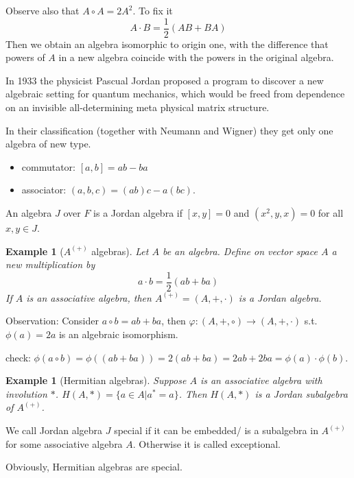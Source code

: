 \documentclass{article}
\newtheorem{example}[theorem]{Example}
\begin{document}
Observe also that $A \circ A = 2A^2$. To fix it
\[
A \cdot B = \frac{1}{2}(AB+BA)
\]
Then we obtain an algebra isomorphic to origin one, with the difference that powers of $A$ in a new algebra coincide with the powers in the original algebra.

In 1933 the physicist Pascual Jordan proposed a program to discover a new algebraic setting for quantum mechanics, which would be freed from dependence on an invisible all-determining meta physical matrix structure.

In their classification (together with Neumann and Wigner) they get only one algebra of new type.

\begin{itemize}
\item commutator: $ [a,b] =a b-b a$
\item associator: $ (a,b,c)=(ab) c-a (b c) $.  
\end{itemize}   

\begin{definition}
An algebra $J$ over $F$ is a Jordan algebra if $[x,y]=0$ and $(x^2,y,x)=0$ for all $x,y \in J$.
\end{definition}

\begin{example}[$ A^{(+)} $ algebras] 
Let $A$ be an algebra. Define on vector space $ A $ a new multiplication by
\[
a \cdot b = \frac{1}{2}(ab+ba)
\]
If $A$ is an associative algebra, then $A^{(+)} = (A, +, \cdot)$ is a Jordan algebra.
\end{example}

Observation: Consider $ a \circ b=ab+ba $, then $ \varphi:  (A, +, \circ) \to (A, +, \cdot) $ s.t. $ \phi(a)=2a $ is an algebraic isomorphism.

check: $ \phi(a \circ b) = \phi((ab+ba)) = 2(ab+ba) = 2ab+2ba = \phi(a) \cdot \phi(b) $.

\begin{example}[Hermitian algebras] 
Suppose $ A $ is an associative algebra with involution $ *$. $ H(A,*) =\{a \in A | a^*=a\}$. Then $ H(A,*) $ is a Jordan subalgebra of $ A^{(+)} $. 
\end{example}

\begin{definition} 
We call Jordan algebra $ J $ special if it can be embedded/ is a subalgebra in $ A^{(+)} $ for some associative algebra $ A $. Otherwise it is called exceptional.
\end{definition}

Obviously, Hermitian algebras are special.
\end{document}
